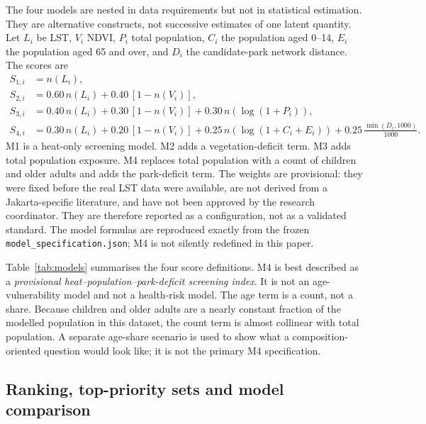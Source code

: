 \documentclass[times,twoside]{_Templates/MultiTargetManuscript}
\begin{document}
The four models are nested in data requirements but not in statistical
estimation. They are alternative constructs, not successive estimates of one
latent quantity. Let $L_i$ be LST, $V_i$ NDVI, $P_i$ total population,
$C_i$ the population aged 0--14, $E_i$ the population aged 65 and over, and
$D_i$ the candidate-park network distance. The scores are
\begin{align}
S_{1,i} &= n(L_i), \label{eq:m1}\\
S_{2,i} &= 0.60\,n(L_i) + 0.40\,[1-n(V_i)], \label{eq:m2}\\
S_{3,i} &= 0.40\,n(L_i) + 0.30\,[1-n(V_i)]
          + 0.30\,n(\log(1+P_i)), \label{eq:m3}\\
S_{4,i} &= 0.30\,n(L_i) + 0.20\,[1-n(V_i)]
          + 0.25\,n(\log(1+C_i+E_i))
          + 0.25\,\frac{\min(D_i,1000)}{1000}. \label{eq:m4}
\end{align}
M1 is a heat-only screening model. M2 adds a vegetation-deficit term. M3 adds
total population exposure. M4 replaces total population with a count of children
and older adults and adds the park-deficit term. The weights are provisional:
they were fixed before the real LST data were available, are not derived from a
Jakarta-specific literature, and have not been approved by the research
coordinator. They are therefore reported as a configuration, not as a validated
standard. The model formulas are reproduced exactly from the frozen
\texttt{model\_specification.json}; M4 is not silently redefined in this paper.

Table~\ref{tab:models} summarises the four score definitions.
M4 is best described as a \emph{provisional heat--population--park-deficit
screening index}. It is not an age-vulnerability model and not a health-risk
model. The age term is a count, not a share. Because children and older adults
are a nearly constant fraction of the modelled population in this dataset, the
count term is almost collinear with total population. A separate age-share
scenario is used to show what a composition-oriented question would look like;
it is not the primary M4 specification.



\subsection{Ranking, top-priority sets and model comparison}
\end{document}
